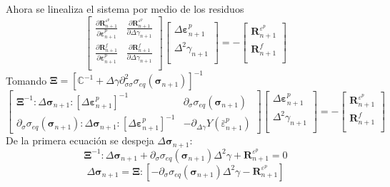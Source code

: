 \documentclass[12pt]{article}
\begin{document}
Ahora se linealiza el sistema por medio de los residuos
\[\renewcommand\arraystretch{1.6}
    \begin{bmatrix}
        \frac{\partial\pmb{R}_{n+1}^{\varepsilon^p}}{\partial \pmb{\varepsilon}^p_{n+1}} & \frac{\partial\pmb{R}_{n+1}^{\varepsilon^p}}{\partial \Delta\gamma_{n+1}} \\ 
        \frac{\partial\pmb{R}_{n+1}^{f}}{\partial \pmb{\varepsilon}^p_{n+1}} & \frac{\partial\pmb{R}_{n+1}^{f}}{\partial \Delta\gamma_{n+1}} \\
    \end{bmatrix}
    \begin{bmatrix}
        \Delta\pmb{\varepsilon}^p_{n+1} \\
        \Delta^2\gamma_{n+1} \\
    \end{bmatrix} = -
    \begin{bmatrix}
        \pmb{R}_{n+1}^{\varepsilon^p} \\
        \pmb{R}_{n+1}^{f} \\
    \end{bmatrix} 
\]
Tomando $\pmb{\Xi} = \left[\mathbb{C}^{-1} + \Delta\gamma\partial^2_{\sigma\sigma}\sigma_{eq}\left(\pmb{\sigma}_{n+1}\right)\right]^{-1}$ 
\[\renewcommand\arraystretch{1.6}
    \begin{bmatrix}
        \pmb{\Xi}^{-1}:\Delta\pmb{\sigma}_{n+1}:\left[\Delta\pmb{\varepsilon}^p_{n+1}\right]^{-1} & \partial_{\sigma}\sigma_{eq}\left(\pmb{\sigma}_{n+1}\right) \\ 
        \partial_{\sigma}\sigma_{eq}\left(\pmb{\sigma}_{n+1}\right):\Delta\pmb{\sigma}_{n+1}:\left[\Delta\pmb{\varepsilon}^p_{n+1}\right]^{-1} & -\partial_{\Delta\gamma}Y\left(\bar\varepsilon^p_{n+1}\right)
    \end{bmatrix}
    \begin{bmatrix}
        \Delta\pmb{\varepsilon}^p_{n+1} \\
        \Delta^2\gamma_{n+1} \\
    \end{bmatrix} = -
    \begin{bmatrix}
        \pmb{R}_{n+1}^{\varepsilon^p} \\
        \pmb{R}_{n+1}^{f} \\
    \end{bmatrix}
\]
De la primera ecuación se despeja $\Delta\pmb{\sigma}_{n+1}$:
\[ \pmb{\Xi}^{-1}:\Delta\pmb{\sigma}_{n+1} + \partial_{\sigma}\sigma_{eq}\left(\pmb{\sigma}_{n+1}\right)\Delta^2\gamma + \pmb{R}_{n+1}^{\varepsilon^p} = 0\]
\[ \Delta\pmb{\sigma}_{n+1} = \pmb{\Xi}:\left[-\partial_{\sigma}\sigma_{eq}\left(\pmb{\sigma}_{n+1}\right)\Delta^2\gamma - \pmb{R}_{n+1}^{\varepsilon^p} \right]\]
\end{document}
